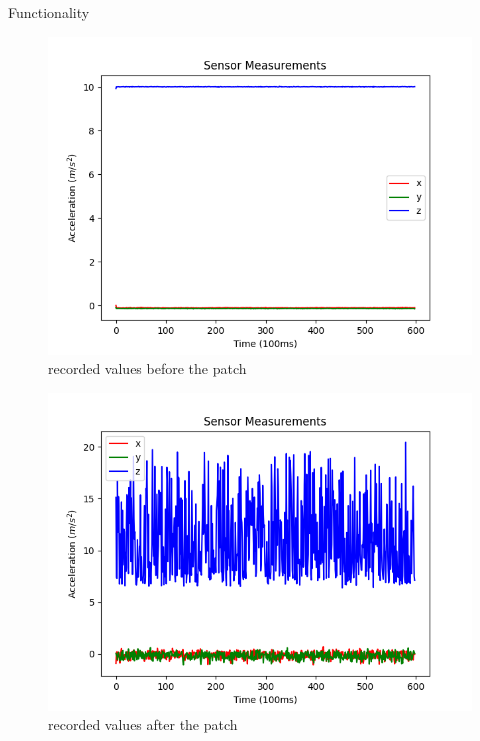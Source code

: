 \documentclass[aspectratio=169]{beamer}
\begin{document}
\begin{frame}{Functionality}
  \begin{minipage}{0.49\textwidth}
    \begin{figure}
      \centering
      \includegraphics[height=0.45\textheight]{figures/SensorValuesBefore.png}
      \caption{recorded values before the patch}
    \end{figure}
  \end{minipage}
  \hfill
  \begin{minipage}{0.49\textwidth}
    \begin{figure}
      \centering
      \includegraphics[height=0.45\textheight]{figures/SensorValuesAfter.png}
      \caption{recorded values after the patch}
    \end{figure}
  \end{minipage}


\end{frame}
\end{document}

